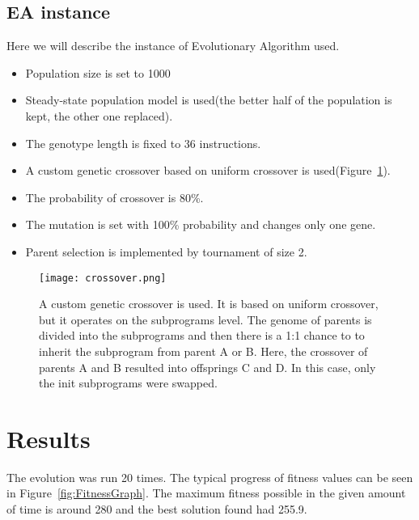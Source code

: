 \documentclass{ExcelAtFIT}
\begin{document}
\subsection{EA instance}
\label{sec:Experiment}
Here we will describe the instance of Evolutionary Algorithm used.
\begin{itemize}
	\item Population size is set to 1000
	\item Steady-state population model is used(the better half of the population is kept, the other one replaced).
	\item The genotype length is fixed to 36 instructions.
	\item A custom genetic crossover based on uniform crossover is used(Figure~\ref{fig:Crossover}).
	\item The probability of crossover is 80\%.
	\item The mutation is set with 100\% probability and changes only one gene.
	\item Parent selection is implemented by tournament of size 2.
\end{itemize}

\begin{figure}[t]
	\centering
	{\texttt{[image: crossover.png]}}
	\caption{
	A custom genetic crossover is used.
	It is based on uniform crossover, but it operates on the subprograms level.
	The genome of parents is divided into the subprograms and then there is a 1:1 chance to to inherit the subprogram from parent A or B.
	Here, the crossover of parents A and B resulted into offsprings C and D.
	In this case, only the init subprograms were swapped.
	}
	\label{fig:Crossover}
\end{figure}




\section{Results}
The evolution was run 20 times.
The typical progress of fitness values can be seen in Figure~\ref{fig:FitnessGraph}.
The maximum fitness possible in the given amount of time is around 280 and the best solution found had 255.9.
\end{document}
